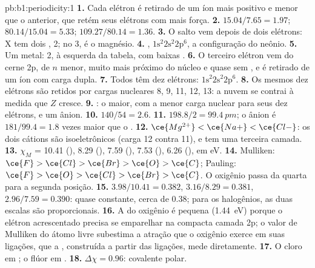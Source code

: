 \begin{solution}{pb:b1:periodicity:1}
\textbf{1.} Cada elétron é retirado de um íon mais positivo e menor que o
anterior, que retém seus elétrons com mais força.
\textbf{2.} $15.04/7.65 = 1.97$; $80.14/15.04 = 5.33$; $109.27/80.14 = 1.36$.
\textbf{3.} O salto vem depois de dois elétrons: X tem dois ,  2; no  3, é o magnésio.
\textbf{4.} , $1\text{s}^2 2\text{s}^2 2\text{p}^6$, a
configuração do neônio.
\textbf{5.} Um metal:  2, à esquerda da tabela, com baixas .
\textbf{6.} O terceiro elétron vem do cerne 2p, de $n$ menor, muito mais
próximo do núcleo e quase sem , e é retirado de um íon com
carga dupla.
\textbf{7.} Todos têm dez elétrons: $1\text{s}^2 2\text{s}^2 2\text{p}^6$.
\textbf{8.} Os mesmos dez elétrons são retidos por cargas nucleares 8, 9,
11, 12, 13: a nuvem se contrai à medida que $Z$ cresce.
\textbf{9.} : o maior, com a menor carga nuclear para seus
dez elétrons, e um ânion.
\textbf{10.} $140/54 = 2.6$.
\textbf{11.} $198.8/2 = \qty{99.4}{pm}$; o ânion é $181/99.4 = 1.8$
vezes maior que o .
\textbf{12.} $\ce{Mg^{2+}} < \ce{Na+} < \ce{Cl-}$: os dois cátions são
isoeletrônicos (carga 12 contra 11), e  tem uma terceira camada.
\textbf{13.} $\chi_M$ = 10.41 (), 8.29 (), 7.59 (),
7.53 (), 6.26 (), em eV.
\textbf{14.} Mulliken: $\ce{F} > \ce{Cl} > \ce{Br} > \ce{O} > \ce{C}$;
Pauling: $\ce{F} > \ce{O} > \ce{Cl} > \ce{Br} > \ce{C}$. O oxigênio passa
da quarta para a segunda posição.
\textbf{15.} $3.98/10.41 = 0.382$, $3.16/8.29 = 0.381$, $2.96/7.59 =
0.390$: quase constante, cerca de 0.38; para os halogênios, as duas
escalas são proporcionais.
\textbf{16.} A  do oxigênio é pequena (\qty{1.44}{eV})
porque o elétron acrescentado precisa se emparelhar na compacta camada
2p; o valor de Mulliken do átomo livre subestima a atração que o oxigênio
exerce em suas ligações, que a , construída a partir das
ligações, mede diretamente.
\textbf{17.} O cloro em ; o flúor em .
\textbf{18.} $\Delta\chi = 0.96$: covalente polar.

\end{solution}
